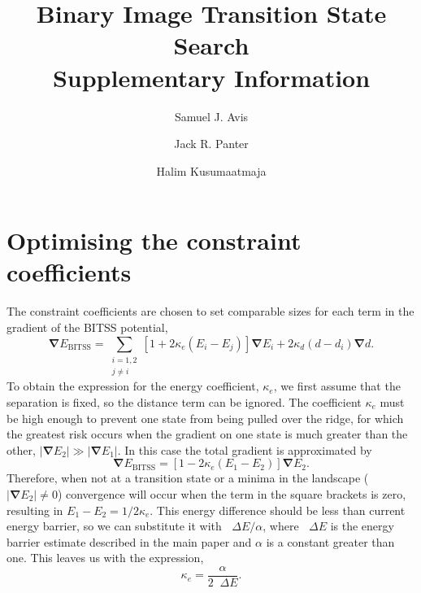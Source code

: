 \documentclass[aps,physrev,10pt]{revtex4-2}
\newcommand{\abs}[1]{\left| #1 \right|}
\newcommand{\grad}{\bm{\nabla}}
\newcommand{\upDelta}{\mathop{}\!\Delta}
\begin{document}
\title{Binary Image Transition State Search \\ Supplementary Information}
\author{Samuel J. Avis}
\author{Jack R. Panter}
\author{Halim Kusumaatmaja}
\maketitle

\section{Optimising the constraint coefficients}
The constraint coefficients are chosen to set comparable sizes for each term in the gradient of the BITSS potential,
\begin{equation} \label{eq:gradBITSS}
  \grad E_\text{BITSS} = \sum_{\substack{i=1,2 \\ j\neq i}} \left[ 1 + 2 \kappa_e (E_i - E_j) \right] \grad E_i + 2 \kappa_d (d - d_i) \grad d.
\end{equation}
To obtain the expression for the energy coefficient, $\kappa_e$, we first assume that the separation is fixed, so the distance term can be ignored.
The coefficient $\kappa_e$ must be high enough to prevent one state from being pulled over the ridge, for which the greatest risk occurs when the gradient on one state is much greater than the other, $\abs{\grad E_2} \gg \abs{\grad E_1}$.
In this case the total gradient is approximated by
\begin{equation}
  \grad E_\text{BITSS} = \left[ 1 - 2 \kappa_e (E_1 - E_2) \right] \grad E_2.
\end{equation}
Therefore, when not at a transition state or a minima in the landscape ($\abs{\grad E_2} \neq 0$) convergence will occur when the term in the square brackets is zero, resulting in $E_1 - E_2 = 1 / 2 \kappa_e$.
This energy difference should be less than current energy barrier, so we can substitute it with $\upDelta E / \alpha$, where $\upDelta E$ is the energy barrier estimate described in the main paper and $\alpha$ is a constant greater than one.
This leaves us with the expression,
\begin{equation}
  \kappa_e = \frac {\alpha} {2 \upDelta E}.
\end{equation}
\end{document}
